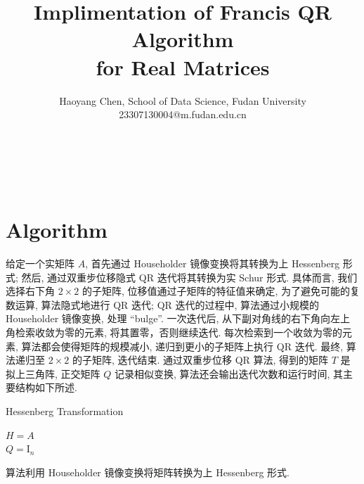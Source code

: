 \documentclass[12pt, a4paper]{ctexart}
\title{Implimentation of Francis QR Algorithm \\ for Real Matrices}
\author{Haoyang Chen, School of Data Science, Fudan University 
    \\ 23307130004@m.fudan.edu.cn}
\date{} %
\makeatletter
\def\maketitle{
  \begin{center} %
    \begin{flushleft} %
    {\LARGE \textbf{\@title}}\\[1em] %
    {\large \@author}\\[1em] %
    \end{flushleft}
  \end{center}
}
\makeatother
\begin{document}
\maketitle

\section{Algorithm}

给定一个实矩阵 \( A \), 首先通过 Householder 镜像变换将其转换为上 Hessenberg 形式;
然后, 通过双重步位移隐式 QR 迭代将其转换为实 Schur 形式.
具体而言, 我们选择右下角 $2 \times 2$ 的子矩阵, 位移值通过子矩阵的特征值来确定, 为了避免可能的复数运算, 算法隐式地进行 QR 迭代;
QR 迭代的过程中, 算法通过小规模的 Householder 镜像变换, 处理 ``bulge''.
一次迭代后, 从下副对角线的右下角向左上角检索收敛为零的元素, 将其置零，否则继续迭代.
每次检索到一个收敛为零的元素, 算法都会使得矩阵的规模减小, 递归到更小的子矩阵上执行 QR 迭代.
最终, 算法递归至 $2 \times 2$ 的子矩阵, 迭代结束.
通过双重步位移 QR 算法, 得到的矩阵 $T$ 是拟上三角阵, 正交矩阵 $Q$ 记录相似变换, 算法还会输出迭代次数和运行时间, 其主要结构如下所述.
\\

\begin{algorithm}[H]
    \caption{Hessenberg Transformation}
    $H = A$ \\
    $Q = \text{I}_n$ \\


\end{algorithm}

\par

算法利用 Householder 镜像变换将矩阵转换为上 Hessenberg 形式.
\\
\par
\end{document}

